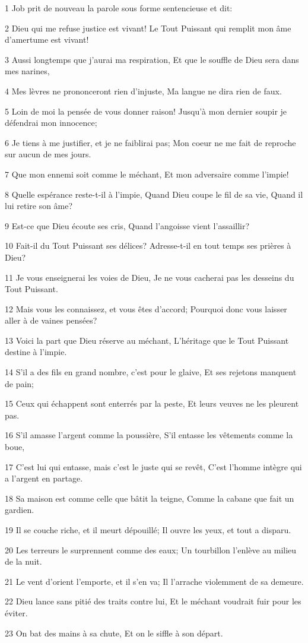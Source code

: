 \par 1 Job prit de nouveau la parole sous forme sentencieuse et dit:
\par 2 Dieu qui me refuse justice est vivant! Le Tout Puissant qui remplit mon âme d'amertume est vivant!
\par 3 Aussi longtemps que j'aurai ma respiration, Et que le souffle de Dieu sera dans mes narines,
\par 4 Mes lèvres ne prononceront rien d'injuste, Ma langue ne dira rien de faux.
\par 5 Loin de moi la pensée de vous donner raison! Jusqu'à mon dernier soupir je défendrai mon innocence;
\par 6 Je tiens à me justifier, et je ne faiblirai pas; Mon coeur ne me fait de reproche sur aucun de mes jours.
\par 7 Que mon ennemi soit comme le méchant, Et mon adversaire comme l'impie!
\par 8 Quelle espérance reste-t-il à l'impie, Quand Dieu coupe le fil de sa vie, Quand il lui retire son âme?
\par 9 Est-ce que Dieu écoute ses cris, Quand l'angoisse vient l'assaillir?
\par 10 Fait-il du Tout Puissant ses délices? Adresse-t-il en tout temps ses prières à Dieu?
\par 11 Je vous enseignerai les voies de Dieu, Je ne vous cacherai pas les desseins du Tout Puissant.
\par 12 Mais vous les connaissez, et vous êtes d'accord; Pourquoi donc vous laisser aller à de vaines pensées?
\par 13 Voici la part que Dieu réserve au méchant, L'héritage que le Tout Puissant destine à l'impie.
\par 14 S'il a des fils en grand nombre, c'est pour le glaive, Et ses rejetons manquent de pain;
\par 15 Ceux qui échappent sont enterrés par la peste, Et leurs veuves ne les pleurent pas.
\par 16 S'il amasse l'argent comme la poussière, S'il entasse les vêtements comme la boue,
\par 17 C'est lui qui entasse, mais c'est le juste qui se revêt, C'est l'homme intègre qui a l'argent en partage.
\par 18 Sa maison est comme celle que bâtit la teigne, Comme la cabane que fait un gardien.
\par 19 Il se couche riche, et il meurt dépouillé; Il ouvre les yeux, et tout a disparu.
\par 20 Les terreurs le surprennent comme des eaux; Un tourbillon l'enlève au milieu de la nuit.
\par 21 Le vent d'orient l'emporte, et il s'en va; Il l'arrache violemment de sa demeure.
\par 22 Dieu lance sans pitié des traits contre lui, Et le méchant voudrait fuir pour les éviter.
\par 23 On bat des mains à sa chute, Et on le siffle à son départ.


